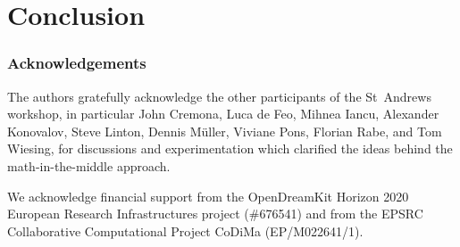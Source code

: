 \section{Conclusion}
\subsubsection*{Acknowledgements}

The authors gratefully acknowledge the other participants of the
St~Andrews workshop, in particular John Cremona, Luca de Feo, Mihnea
Iancu, Alexander Konovalov, Steve Linton, Dennis M\"uller, Viviane
Pons, Florian Rabe, and Tom Wiesing, for discussions and
experimentation which clarified the ideas behind the
math-in-the-middle approach.

We acknowledge financial support from the OpenDreamKit Horizon 2020 European Research
Infrastructures project (\#676541) and from the EPSRC Collaborative Computational Project
CoDiMa (EP/M022641/1).


